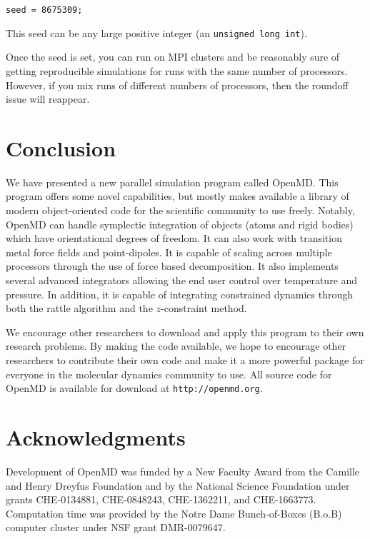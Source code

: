\documentclass[]{book}
\begin{document}
{\tt seed = 8675309;}

This seed can be any large positive integer (an {\tt unsigned long int}).

Once the seed is set, you can run on MPI clusters and be reasonably
sure of getting reproducible simulations for runs with the same number
of processors.  However, if you mix runs of different numbers of
processors, then the roundoff issue will reappear.
 
\chapter{\label{section:conclusion}Conclusion}

We have presented a new parallel simulation program called {\sc
OpenMD}. This program offers some novel capabilities, but mostly makes
available a library of modern object-oriented code for the scientific
community to use freely.  Notably, {\sc OpenMD} can handle symplectic
integration of objects (atoms and rigid bodies) which have
orientational degrees of freedom.  It can also work with transition
metal force fields and point-dipoles. It is capable of scaling across
multiple processors through the use of force based decomposition. It
also implements several advanced integrators allowing the end user
control over temperature and pressure. In addition, it is capable of
integrating constrained dynamics through both the {\sc rattle}
algorithm and the $z$-constraint method.

We encourage other researchers to download and apply this program to
their own research problems.  By making the code available, we hope to
encourage other researchers to contribute their own code and make it a
more powerful package for everyone in the molecular dynamics community
to use.  All source code for {\sc OpenMD} is available for download at
{\tt http://openmd.org}.

\chapter{Acknowledgments}

Development of {\sc OpenMD} was funded by a New Faculty Award from the
Camille and Henry Dreyfus Foundation and by the National Science
Foundation under grants CHE-0134881, CHE-0848243, CHE-1362211, and
CHE-1663773. Computation time was provided by the Notre Dame
Bunch-of-Boxes (B.o.B) computer cluster under NSF grant DMR-0079647.



\end{document}
